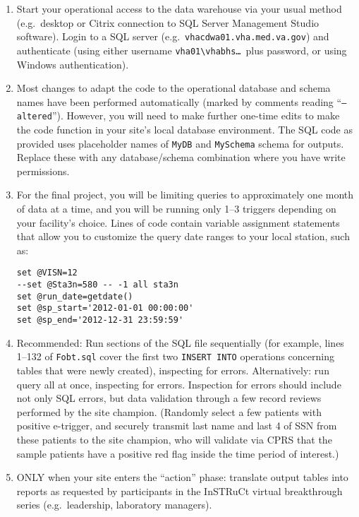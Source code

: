 \documentclass{article}
\begin{document}
\begin{enumerate}

\item Start your operational access to the data warehouse via your
  usual method (e.g.\ desktop or Citrix connection to SQL Server
  Management Studio software). Login to a SQL server
  (e.g.\ \texttt{vhacdwa01.vha.med.va.gov}) and authenticate (using
  either username \texttt{vha01\textbackslash{}vhabhs\ldots{}}\ plus
  password, or using Windows authentication).

\item Most changes to adapt the code to the operational database and
  schema names have been performed automatically (marked by comments
  reading ``\texttt{--altered}''). However, you will need to make
  further one-time edits to make the code function in your site's
  local database environment. The SQL code as provided uses
  placeholder names of \texttt{MyDB} and \texttt{MySchema} schema for
  outputs. Replace these with any database/schema combination where
  you have write permissions.

\item For the final project, you will be limiting queries to
  approximately one month of data at a time, and you will be running
  only 1--3 triggers depending on your facility's choice. Lines of
  code contain variable assignment statements that allow you to
  customize the query date ranges to your local station, such as:

\begin{verbatim}
set @VISN=12
--set @Sta3n=580 -- -1 all sta3n
set @run_date=getdate()
set @sp_start='2012-01-01 00:00:00'
set @sp_end='2012-12-31 23:59:59'
\end{verbatim}

\item Recommended: Run sections of the SQL file sequentially (for
  example, lines 1--132 of \texttt{Fobt.sql} cover the first two
  \texttt{INSERT INTO} operations concerning tables that were newly
  created), inspecting for errors. Alternatively: run query all at
  once, inspecting for errors. Inspection for errors should include
  not only SQL errors, but data validation through a few record
  reviews performed by the site champion. (Randomly select a few
  patients with positive e-trigger, and securely transmit last name
  and last 4 of SSN from these patients to the site champion, who will
  validate via CPRS that the sample patients have a positive red flag
  inside the time period of interest.)

\item ONLY when your site enters the ``action'' phase: translate output
  tables into reports as requested by participants in the InSTRuCt
  virtual breakthrough series (e.g.\ leadership, laboratory managers).

\end{enumerate}
\end{document}
